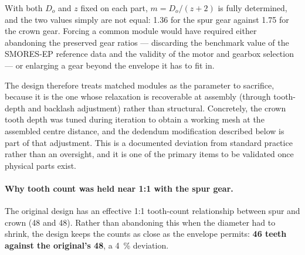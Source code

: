 \documentclass[12pt,a4paper]{article}
\begin{document}
With both $D_o$ and $z$ fixed on each part, $m = D_o/(z+2)$ is fully determined,
and the two values simply are not equal: \num{1.36} for the spur gear against
\num{1.75} for the crown gear. Forcing a common module would have required
either abandoning the preserved gear ratios --- discarding the benchmark value
of the SMORES-EP reference data and the validity of the motor and gearbox
selection --- or enlarging a gear beyond the envelope it has to fit in.

The design therefore treats matched modules as the parameter to sacrifice,
because it is the one whose relaxation is recoverable at assembly (through
tooth-depth and backlash adjustment) rather than structural. Concretely, the
crown tooth depth was tuned during iteration to obtain a working mesh at the
assembled centre distance, and the dedendum modification described below is
part of that adjustment. This is a documented deviation from standard practice
rather than an oversight, and it is one of the primary items to be validated
once physical parts exist.

\paragraph{Why tooth count was held near 1:1 with the spur gear.}
The original design has an effective 1:1 tooth-count relationship between spur
and crown (48 and 48). Rather than abandoning this when the diameter had to
shrink, the design keeps the counts as close as the envelope permits:
\textbf{46 teeth against the original's 48}, a \SI{4}{\percent} deviation.
\end{document}
